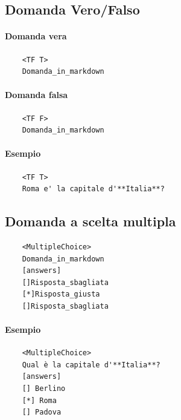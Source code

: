 \documentclass[12pt,a4paper]{article}
\begin{document}
	\subsection{Domanda Vero/Falso}
	\paragraph{Domanda vera}
	\begin{verbatim}
	<TF T>
	Domanda_in_markdown
	\end{verbatim}
	\paragraph{Domanda falsa}
	\begin{verbatim}
	<TF F>
	Domanda_in_markdown
	\end{verbatim}
	\paragraph{Esempio}
	\begin{verbatim}
	<TF T>
	Roma e' la capitale d'**Italia**?
	\end{verbatim}
	
	\subsection{Domanda a scelta multipla}
	\begin{verbatim}
	<MultipleChoice>
	Domanda_in_markdown
	[answers]
	[]Risposta_sbagliata
	[*]Risposta_giusta
	[]Risposta_sbagliata
	\end{verbatim}
	\paragraph{Esempio}
	\begin{verbatim}
	<MultipleChoice>
	Qual è la capitale d'**Italia**?
	[answers]
	[] Berlino
	[*] Roma
	[] Padova
	\end{verbatim}
	
	
\end{document}
